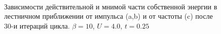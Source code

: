 \documentclass[11pt,a4paper]{report}
\begin{document}
\begin{figure}[H]
\centering
{}
\\
\caption{Зависимости действительной и мнимой части собственной энергии в лестничном приближении от импульса (a,b) и от частоты (c) после 30-и итераций цикла. $\beta=10$, $U=4.0$, $t=0.25$}
\label{SigmaLDFA}
\end{figure}
\end{document}

